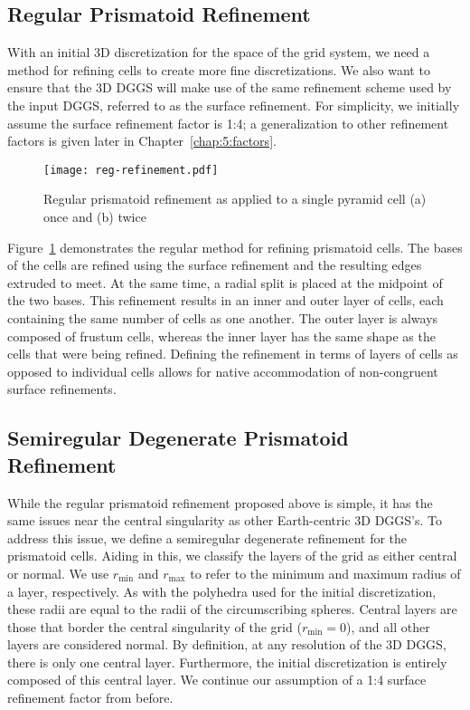 \subsection{Regular Prismatoid Refinement} \label{chap:5:regular}
With an initial 3D discretization for the space of the grid system, we need a method for refining cells to create more fine discretizations.
We also want to ensure that the 3D DGGS will make use of the same refinement scheme used by the input DGGS, referred to as the surface refinement.
For simplicity, we initially assume the surface refinement factor is 1:4; a generalization to other refinement factors is given later in Chapter~\ref{chap:5:factors}.


\begin{figure}[ht!]
	\centering
	\texttt{[image: reg-refinement.pdf]}
	\caption[Regular prismatoid refinement]{
		Regular prismatoid refinement as applied to a single pyramid cell (a) once and (b) twice
	}
	\label{fig:regular}
\end{figure}


Figure~\ref{fig:regular} demonstrates the regular method for refining prismatoid cells.
The bases of the cells are refined using the surface refinement and the resulting edges extruded to meet.
At the same time, a radial split is placed at the midpoint of the two bases.
This refinement results in an inner and outer layer of cells, each containing the same number of cells as one another.
The outer layer is always composed of frustum cells, whereas the inner layer has the same shape as the cells that were being refined.
Defining the refinement in terms of layers of cells as opposed to individual cells allows for native accommodation of non-congruent surface refinements.


\subsection{Semiregular Degenerate Prismatoid Refinement} \label{chap:5:semireg}
While the regular prismatoid refinement proposed above is simple, it has the same issues near the central singularity as other Earth-centric 3D DGGS's.
To address this issue, we define a semiregular degenerate refinement for the prismatoid cells.
Aiding in this, we classify the layers of the grid as either central or normal.
We use $r_\mathrm{min}$ and $r_\mathrm{max}$ to refer to the minimum and maximum radius of a layer, respectively.
As with the polyhedra used for the initial discretization, these radii are equal to the radii of the circumscribing spheres.
Central layers are those that border the central singularity of the grid ($r_\mathrm{min} = 0$), and all other layers are considered normal.
By definition, at any resolution of the 3D DGGS, there is only one central layer.
Furthermore, the initial discretization is entirely composed of this central layer.
We continue our assumption of a 1:4 surface refinement factor from before.


